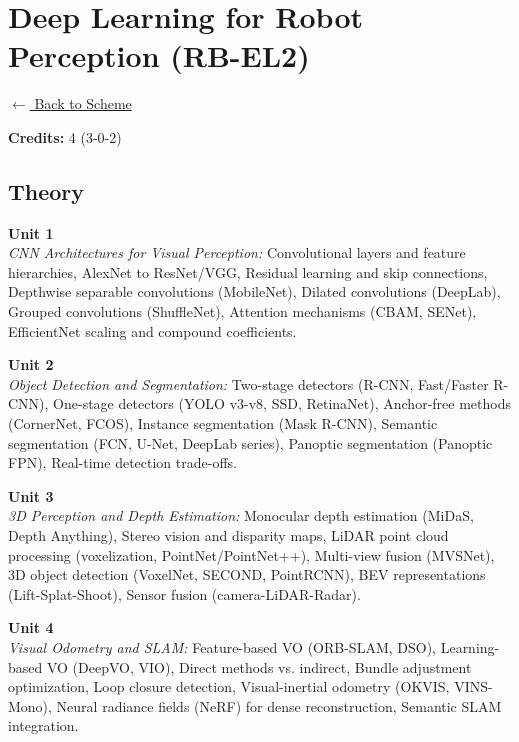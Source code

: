 \section*{Deep Learning for Robot Perception (RB-EL2)}
\label{elec:RB_2}

\noindent \small{\hyperref[main:scheme]{$\leftarrow$ Back to Scheme}} \vspace{0.5cm}

\noindent \textbf{Credits:} 4 (3-0-2)

\subsection*{Theory}
\noindent\textbf{Unit 1} \\
\textit{CNN Architectures for Visual Perception:} Convolutional layers and feature hierarchies, AlexNet to ResNet/VGG, Residual learning and skip connections, Depthwise separable convolutions (MobileNet), Dilated convolutions (DeepLab), Grouped convolutions (ShuffleNet), Attention mechanisms (CBAM, SENet), EfficientNet scaling and compound coefficients.

\vspace{0.3cm}

\noindent\textbf{Unit 2} \\
\textit{Object Detection and Segmentation:} Two-stage detectors (R-CNN, Fast/Faster R-CNN), One-stage detectors (YOLO v3-v8, SSD, RetinaNet), Anchor-free methods (CornerNet, FCOS), Instance segmentation (Mask R-CNN), Semantic segmentation (FCN, U-Net, DeepLab series), Panoptic segmentation (Panoptic FPN), Real-time detection trade-offs.

\vspace{0.3cm}

\noindent\textbf{Unit 3} \\
\textit{3D Perception and Depth Estimation:} Monocular depth estimation (MiDaS, Depth Anything), Stereo vision and disparity maps, LiDAR point cloud processing (voxelization, PointNet/PointNet++), Multi-view fusion (MVSNet), 3D object detection (VoxelNet, SECOND, PointRCNN), BEV representations (Lift-Splat-Shoot), Sensor fusion (camera-LiDAR-Radar).

\vspace{0.3cm}

\noindent\textbf{Unit 4} \\
\textit{Visual Odometry and SLAM:} Feature-based VO (ORB-SLAM, DSO), Learning-based VO (DeepVO, VIO), Direct methods vs. indirect, Bundle adjustment optimization, Loop closure detection, Visual-inertial odometry (OKVIS, VINS-Mono), Neural radiance fields (NeRF) for dense reconstruction, Semantic SLAM integration.

